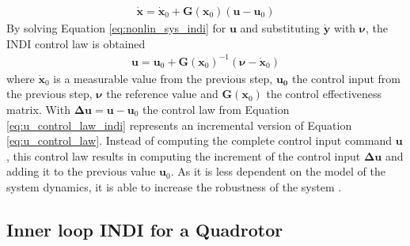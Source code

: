 \documentclass[11pt, a4paper, twoside]{report}
\begin{document}
\begin{equation}
	\begin{split}
		\bm{\dot{x}} = \bm{\dot{x}}_0 + \bm{G}(\bm{x}_0) (\bm{u}-\bm{u}_0) 
		\label{eq:nonlin_sys_indi}
	\end{split}
\end{equation}
By solving Equation \ref{eq:nonlin_sys_indi} for $\bm{u}$ and substituting $\bm{\dot{y}}$ with $\bm{\nu}$, the \acrshort{INDI} control law is obtained
\begin{equation}
	\begin{split}
		\bm{u} = \bm{u}_0 + \bm{G}(\bm{x}_0)^{-1} (\bm{\nu} - \bm{\dot{x}}_0)
		\label{eq:u_control_law_indi}
	\end{split}
\end{equation}
where $\bm{\dot{x}}_0$ is a measurable value from the previous step, $\bm{u_0}$ the control input from the previous step, $\bm{\nu}$ the reference value and $\bm{G}(\bm{x}_0)$ the control effectiveness matrix. With $\bm{\Delta u}=\bm{u}-\bm{u}_0$ the control law from Equation \ref{eq:u_control_law_indi} represents an incremental version of Equation \ref{eq:u_control_law}. Instead of computing the complete control input command $\bm{u}$, this control law results in computing the increment of the control input $\bm{\Delta u}$ and adding it to the previous value $\bm{u}_0$. As it is less dependent on the model of the system dynamics, it is able to increase the robustness of the system \cite{Sieberling}.

\subsection{Inner loop INDI for a Quadrotor} \label{subsec: indi_inner}
\end{document}
